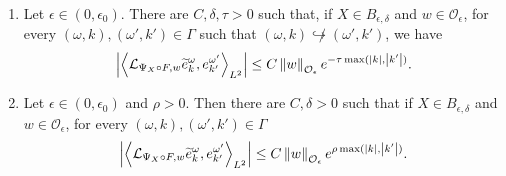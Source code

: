\documentclass[AHL,Unicode,longabstracts,published]{cedram}
\newcommand{\n}[1]{\left\|#1\right\|}
\newcommand{\va}[1]{\left|#1\right|}
\newcommand{\clO}{\mathcal{O}}
\newcommand{\clL}{\mathcal{L}}
\newcommand*{\romanenumi}{\renewcommand*{\theenumi}{\roman{enumi}}}
\let\oldtilde\tilde
\renewcommand*{\tilde}[1]{\mathchoice{\widetilde{#1}}{\widetilde{#1}}{\oldtilde{#1}}{\oldtilde{#1}}}
\newcommand{\clO}{\mathcal{O}}
\begin{document}
\begin{lemm}\label{lemma:discard}\leavevmode
\begin{enumerate}\romanenumi
\item \label{item:discard_not}
Let $\epsilon \in (0,\epsilon_0)$. There are $C,\delta, \tau >0$ such that, if $X \in B_{\epsilon,\delta}$ and $w \in \clO_\epsilon$, for every $(\omega,k),(\omega',k') \in \Gamma$ such that $(\omega,k) \not\hookrightarrow (\omega',k')$, we have
\begin{equation*}
\va{\left\langle \clL_{\Psi_X \circ F,w} \tilde{e}_{k}^{\omega}, e_{k'}^{\omega'} \right\rangle_{L^2}} \leq C \n{w}_{\clO_\epsilon} e^{ - \tau \max(\va{k},\va{k'})}.
\end{equation*}
\item Let $\epsilon \in (0,\epsilon_0)$ and $\rho > 0$. Then there are $C, \delta > 0$ such that if $X \in B_{\epsilon,\delta}$ and $w \in \clO_\epsilon$, for every $(\omega,k),(\omega',k') \in \Gamma$
\begin{equation}\label{eq:weak_discard}
\va{\left\langle \clL_{\Psi_X \circ F,w} \tilde{e}_{k}^{\omega}, e_{k'}^{\omega'} \right\rangle_{L^2}} \leq C \n{w}_{\clO_\epsilon} e^{\rho \max(\va{k},\va{k'})}.
\end{equation}
\end{enumerate}
\end{lemm}
\end{document}
